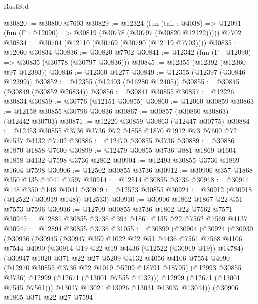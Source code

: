 \begin{lexlean}{RustStd}
\begin{coremodule}
@30820 := @30800 @7603
@30829 := @12324
    (fun (tail : @4038) => @12091 (fun (Γ : @12090) => @30819 (@30778 (@30797 (@30820 @12122)))))
    @7702
@30834 := @30704 (@12110 (@30769 (@30790 (@12119 @7703))))
@30835 := @12060 @30834
@30836 := @30820 @7702
@30841 := @12342 (fun (Γ : @12090) => @30835 (@30778 (@30797 @30836)))
@30845 := @12355 (@12392 (@12360 @97 @12393))
@30846 := @12360 @1277
@30849 := @12355 (@12397 (@30846 @12399))
@30852 := @12355 (@12403 (@16280 @12405))
@30855 := @30845 (@30849 (@30852 @26834))
@30856 := @30841 @30855
@30857 := @12226 @30834
@30859 := @30776 (@12151 @30855)
@30860 := @12060 @30859
@30863 := @12158 @30855 @30796 @30836
@30867 := @30857 (@30860 @30863) (@12442 @30703)
@30871 := @12226 @30859 @30863 (@12447 @30775)
@30884 := @12453 @30855 @3736 @3736 @72 @1858 @1870 @1912 @73 @7600 @72 @7537 @4132 @7702
@30886 := @12470 @30855 @3736
@30889 := @30886 @1870 @1858 @7600
@30899 := @12479 @30855 @3736 @881 @1869 @1604 @1858 @4132 @7598 @3736 @2862
@30904 := @12493 @30855 @3736 @1869 @1604 @7598
@30906 := @12502 @30855 @3736
@30912 := @30906 @357 @1868 @350 @135 @4041 @7597
@30914 := @12514 @30855 @3736
@30918 := @30914 @148 @350 @148 @4041
@30919 := @12523 @30855
@30924 := @30912 (@30918 (@12522 (@30919 @148)) @12533)
@30930 := @30906 @1862 @1867 @22 @51 @7573 @7596
@30936 := @12709 @30855 @3736 @1862 @22 @7562 @7571
@30945 := @12881 @30855 @3736 @394 @1861 @135 @22 @7562 @7569 @4137
@30947 := @12894 @30855 @3736
@31055 := @30899
    (@30904
      (@30924
        (@30930
          (@30936
            (@30945
              (@30947
                @359
                @1022
                @22
                @51
                @4436
                @7561
                @7568
                @4106
                @7544
                @4090
                (@30914 @19 @22 @19 @4436 (@12522 (@30919 @19)) @14784)
                (@30947
                  @1020
                  @371
                  @22
                  @27
                  @5209
                  @4132
                  @4056
                  @4106
                  @7554
                  @4090
                  (@12970 @30855 @3736 @22 @1019 @5209 @18791 @18795)
                  (@12993 @30855 @3736)
                  @12999
                  (@12671 (@13001 @7555 @4132)))
                @12999
                (@12671 (@13001 @7545 @7561)))
              @13017
              @13021
              @13026
              @13031
              @13037
              @13044))
          (@30906
            @1865
            @371
            @22
            @27
            @7594

\end{coremodule}
\end{lexlean}
